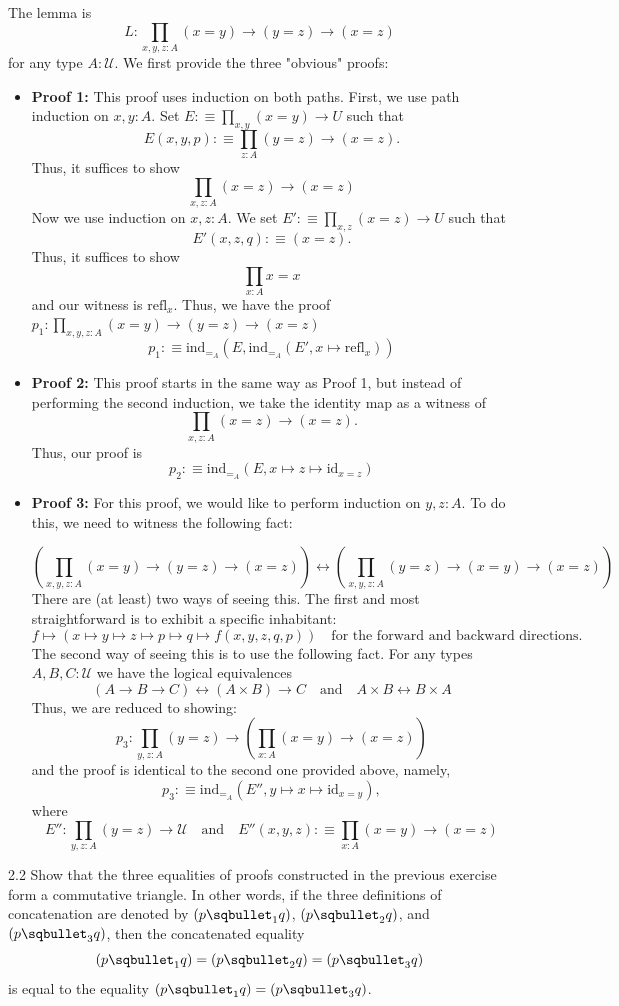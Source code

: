 \documentclass[14pt]{extarticle}
\newcommand{\0}{{\mathbf 0}}
\newcommand{\1}{{\mathbf 1}}
\newcommand{\2}{{\mathbf 2}}
\newcommand{\UU}{{\mathcal U}}
\newcommand{\mt}{\mapsto}
\newcommand{\ind}{\mathrm{ind}}
\newcommand{\refl}{\mathrm{refl}}
\newcommand{\id}{\mathrm{id}}
\newcommand{\quadt}[1]{\quad \text{#1} \quad}
\begin{document}
The lemma is \[L : \prod_{x,y,z:A} (x = y) \to (y = z) \to (x = z)\] for any type $A : \UU$. We first provide the three "obvious" proofs:

\begin{itemize}
\item \textbf{Proof 1:} This proof uses induction on both paths. First, we use path induction on $x,y:A$. Set $E :\equiv \prod_{x,y} (x = y) \to U$ such that \[E(x,y,p) :\equiv \prod_{z:A} (y = z) \to (x = z).\] Thus, it suffices to show
\[\prod_{x,z:A} (x = z) \to (x = z)\]
Now we use induction on $x,z : A$. We set $E' : \equiv \prod_{x,z} (x = z) \to U$ such that \[E'(x,z,q) : \equiv (x = z).\] Thus, it suffices to show
\[\prod_{x : A} x = x\] and our witness is $\refl_x$. Thus, we have the proof $p_1 : \prod_{x,y,z:A} (x = y) \to (y = z) \to (x = z)$
\[p_1 :\equiv \ind_{=_A}(E, \ind_{=_A}(E',x \mt \refl_x))\]

\item \textbf{Proof 2:} This proof starts in the same way as Proof 1, but instead of performing the second induction, we take the identity map as a witness of
\[\prod_{x,z:A} (x = z) \to (x = z).\] Thus, our proof is
\[p_2 :\equiv \ind_{=_A}(E, x \mt z \mt \id_{x=z})\]
\item \textbf{Proof 3:}
For this proof, we would like to perform induction on $y,z : A$. To do this, we need to witness the following fact:

\[\left(\prod_{x,y,z:A} (x = y) \to (y = z) \to (x = z)\right) \leftrightarrow \left(\prod_{x,y,z:A} (y = z) \to (x = y) \to (x = z)\right) \]
There are (at least) two ways of seeing this. The first and most straightforward is to exhibit a specific inhabitant:
\[f \mt (x \mt y \mt z \mt p \mt q \mt f(x,y,z,q,p))\quad \text{for the forward and backward directions}.\]
The second way of seeing this is to use the following fact. For any types $A,B,C : \UU$ we have the logical equivalences
\[(A \to B \to C) \leftrightarrow (A \times B) \to C \quadt{and} A \times B \leftrightarrow B \times A\]
 Thus, we are reduced to showing:
 \[p_3 : \prod_{y,z:A} (y = z) \to  \left(\prod_{x:A}(x = y) \to (x = z) \right)\] and the proof is identical to the second one provided above, namely,
\[p_3 :\equiv \ind_{=_A}(E'', y \mt x \mt \id_{x=y}),\] where
\[E'' : \prod_{y,z : A} (y = z) \to \UU \quadt{and} E''(x,y,z) :\equiv \prod_{x :A} (x = y) \to (x = z)\]
\end{itemize}


\begin{prob}{2.2}{}
Show that the three equalities of proofs constructed in the previous exercise form a commutative triangle. In other words, if the three definitions of concatenation are denoted by $(p \sqbullet_1 q)$, $(p \sqbullet_2 q)$, and $(p \sqbullet_3 q)$, then the concatenated equality
\[(p \sqbullet_1 q) = (p \sqbullet_2 q) = (p \sqbullet_3 q)\] is equal to the equality $(p \sqbullet_1 q) = (p \sqbullet_3 q)$.
\end{prob}
\end{document}
